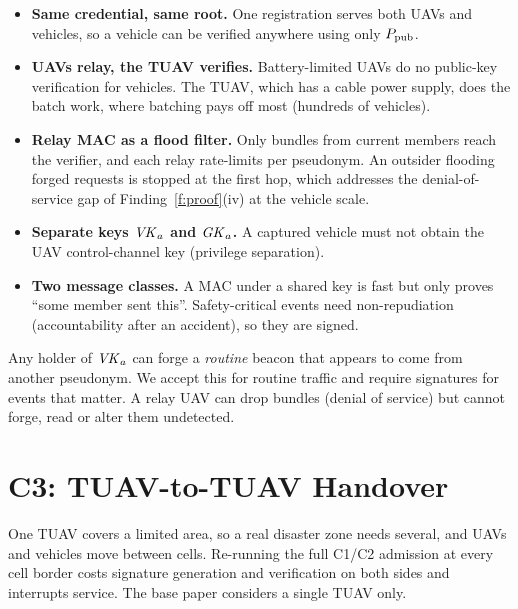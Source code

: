 \begin{whybox}
\begin{itemize}[leftmargin=*]
  \item \textbf{Same credential, same root.} One registration serves both UAVs and vehicles, so a vehicle can be verified anywhere using only $P_{\mathrm{pub}}$.
  \item \textbf{UAVs relay, the TUAV verifies.} Battery-limited UAVs do no public-key verification for vehicles. The TUAV, which has a cable power supply, does the batch work, where batching pays off most (hundreds of vehicles).
  \item \textbf{Relay MAC as a flood filter.} Only bundles from current members reach the verifier, and each relay rate-limits per pseudonym. An outsider flooding forged requests is
        stopped at the first hop, which addresses the denial-of-service gap of Finding~\ref{f:proof}(iv) at the vehicle scale.
  \item \textbf{Separate keys $\mathit{VK}_a$ and $\mathit{GK}_a$.} A captured vehicle must not obtain the UAV control-channel key (privilege separation).
  \item \textbf{Two message classes.} A MAC under a shared key is fast but only proves ``some member sent this''. Safety-critical events need
        non-repudiation (accountability after an accident), so they are signed.
\end{itemize}
\end{whybox}
\begin{limitbox}
Any holder of $\mathit{VK}_a$ can forge a \emph{routine} beacon that appears to come from another pseudonym. We accept this for routine traffic and require signatures
for events that matter. A relay UAV can drop bundles (denial of service) but cannot forge, read or alter them undetected.
\end{limitbox}

\chapter{C3: TUAV-to-TUAV Handover}\label{sec:c3}
One TUAV covers a limited area, so a real disaster zone needs several, and UAVs and vehicles move between cells. Re-running the full C1/C2
admission at every cell border costs signature generation and verification on both sides and interrupts service. The base paper considers a single TUAV only.

